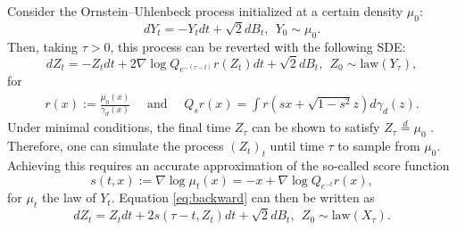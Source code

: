\documentclass{article}
\begin{document}
Consider the
Ornstein–Uhlenbeck process initialized at a certain density $\mu_0$:
\begin{equation*}
    dY_t=-Y_tdt+\sqrt{2}dB_t,\ \ Y_0\sim \mu_0.
\end{equation*}
Then, taking $\tau>0$, this process can be reverted with the following SDE:
\begin{equation}\label{eq:backward}
    dZ_t=-Z_tdt+2\nabla \log Q_{e^{-(\tau-t)}}r(Z_t)dt+\sqrt{2}dB_t,\ \ Z_0\sim \text{law}(Y_\tau),
\end{equation}
for
\begin{align*}
    r(x):=\frac{\mu_0(x)}{\gamma_d(x)} \quad \text{ and } \quad Q_s r(x)= \int r(sx+\sqrt{1-s^2}z)d\gamma_d(z).
\end{align*}
Under minimal conditions, the final time $Z_\tau$ can be shown to satisfy $Z_\tau \overset{d}{=} \mu_0$ \citep{ANDERSON1982313}. Therefore, one can simulate the process $(Z_t)_t$ until
time $\tau$ to sample from $\mu_0$. Achieving this requires an accurate approximation of the so-called score function $$s(t,x):= \nabla \log \mu_t(x) =-x+\nabla \log Q_{e^{-t}}r(x),$$
for $\mu_t$ the law of $Y_t$.
Equation \eqref{eq:backward} can then be written as
\begin{equation*}
dZ_t=Z_tdt+2s(\tau-t,Z_t)dt+\sqrt{2}dB_t,\ \ Z_0\sim \text{law}(X_\tau).
\end{equation*}
\end{document}
